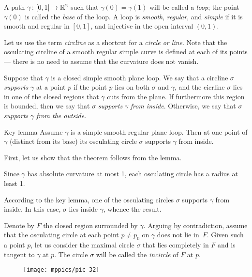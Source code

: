 \documentclass{article}
\begin{document}
\medskip

A path $\gamma\: [0,1]\z\to \mathbb{R}^2$ such that $\gamma (0) = \gamma (1)$ will be called a \emph{loop};
the point $\gamma (0)$ is called the \emph{base} of the loop.
A loop is \emph{smooth}, \emph{regular}, and \emph{simple} if it is smooth and regular in $[0,1]$, and injective in the open interval $(0,1)$.

Let us use the term \emph{circline} as a shortcut for a \emph{circle or line}.
Note that the osculating circline of a smooth regular simple curve is defined at each of its points --- there is no need to assume that the curvature does not vanish.

Suppose that $\gamma$ is a closed simple smooth plane loop.
We say that a circline $\sigma$ \emph{supports} $\gamma$ at a point $p$ if the point $p$ lies on both $\sigma$ and $\gamma$, and the cicrline $\sigma$ lies in one of the closed regions that $\gamma$ cuts from the plane.
If furthermore this region is bounded, then  we say that $\sigma$ \emph{supports} $\gamma$ \emph{from inside}.
Otherwise, we say that $\sigma$ \emph{supports} $\gamma$ \emph{from the outside}.

\begin{thm}{Key lemma}\label{thm:moon}
Assume $\gamma$ is a simple smooth regular plane loop.
Then at one point of $\gamma$ (distinct from its base) its osculating circle $\sigma$ supports $\gamma$ from inside.
\end{thm}

First, let us show that the theorem follows from the lemma.

Since $\gamma$ has absolute curvature at most 1, each osculating circle has a radius at least 1.

According to the key lemma, one of the osculating circles $\sigma$ supports $\gamma$ from inside.
In this case, $\sigma$ lies inside $\gamma$, whence the result.
\qeds

Denote by $F$ the closed region surrounded by $\gamma$.
Arguing by contradiction,
assume that the osculating circle at each point $p\ne p_0$ on $\gamma$ does not lie in~$F$.
Given such a point $p$, let us consider the maximal circle $\sigma$ that lies completely in $F$ and is tangent to $\gamma$ at $p$.
The circle $\sigma$ will be called the {}\emph{incircle} of $F$ at $p$.
\begin{figure}[!ht]
\vskip-3mm
\centering
\texttt{[image: mppics/pic-32]}
\vskip0mm
\end{figure}
\end{document}
